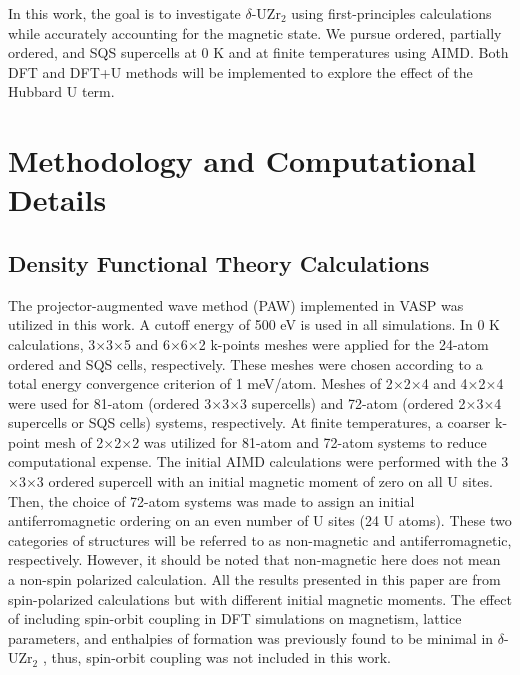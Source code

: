 \documentclass[preprint,12pt]{elsarticle}
\begin{document}
In this work, the goal is to investigate $\delta$-UZr$_2$ using first-principles calculations while accurately accounting for the magnetic state. We pursue ordered, partially ordered, and SQS supercells at 0 K and at finite temperatures using AIMD. Both DFT and DFT+U methods will be implemented to explore the effect of the Hubbard U term.

\section{Methodology and Computational Details}

\subsection{Density Functional Theory Calculations}
The projector-augmented wave method (PAW) \cite{blochl_projector_1994} implemented in VASP \cite{kresse_ab_1993,kresse_efficient_1996} was utilized in this work. A cutoff energy of 500 eV is used in all simulations. In 0 K calculations, 3$\times$3$\times$5 and 6$\times$6$\times$2 k-points meshes were applied for the 24-atom ordered and SQS cells, respectively. These meshes were chosen according to a total energy convergence criterion of 1 meV/atom. Meshes of 2$\times$2$\times$4 and 4$\times$2$\times$4 were used for 81-atom (ordered 3$\times$3$\times$3 supercells) and 72-atom (ordered 2$\times$3$\times$4 supercells or SQS cells) systems, respectively. At finite temperatures, a coarser k-point mesh of 2$\times$2$\times$2 was utilized for 81-atom and 72-atom systems to reduce computational expense. The initial AIMD calculations were performed with the 3$\times$3$\times$3 ordered supercell with an initial magnetic moment of zero on all U sites. Then, the choice of 72-atom systems was made to assign an initial antiferromagnetic ordering on an even number of U sites (24 U atoms). These two categories of structures will be referred to as non-magnetic and antiferromagnetic, respectively. However, it should be noted that non-magnetic here does not mean a non-spin polarized calculation. All the results presented in this paper are from spin-polarized calculations but with different initial magnetic moments.
The effect of including spin-orbit coupling in DFT simulations on magnetism, lattice parameters, and enthalpies of formation was previously found to be minimal in $\delta$-UZr$_2$ \cite{xie_correlation_2013, ghosh_chemical_2021}, thus, spin-orbit coupling was not included in this work.
\end{document}
